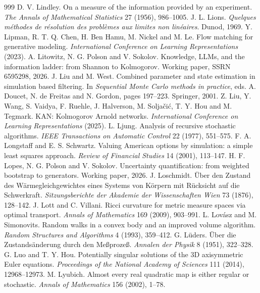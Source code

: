 \begin{thebibliography}{999}
 D. V. Lindley. On a measure of the information provided by an experiment. \emph{The Annals of Mathematical Statistics} 27 (1956), 986--1005.
 J. L. Lions. \emph{Quelques m\'ethodes de r\'esolution des probl\`emes aux limites non lin\'eaires}. Dunod, 1969.
 Y. Lipman, R. T. Q. Chen, H. Ben Hamu, M. Nickel and M. Le. Flow matching for generative modeling. \emph{International Conference on Learning Representations} (2023).
 A. Litowitz, N. G. Polson and V. Sokolov. Knowledge, LLMs, and the information ladder: from Shannon to Kolmogorov. Working paper, SSRN 6595298, 2026.
 J. Liu and M. West. Combined parameter and state estimation in simulation based filtering. In \emph{Sequential Monte Carlo methods in practice}, eds. A. Doucet, N. de Freitas and N. Gordon, pages 197--223. Springer, 2001.
 Z. Liu, Y. Wang, S. Vaidya, F. Ruehle, J. Halverson, M. Solja\v{c}i\'c, T. Y. Hou and M. Tegmark. KAN: Kolmogorov Arnold networks. \emph{International Conference on Learning Representations} (2025).
 L. Ljung. Analysis of recursive stochastic algorithms. \emph{IEEE Transactions on Automatic Control} 22 (1977), 551--575.
 F. A. Longstaff and E. S. Schwartz. Valuing American options by simulation: a simple least squares approach. \emph{Review of Financial Studies} 14 (2001), 113--147.
 H. F. Lopes, N. G. Polson and V. Sokolov. Uncertainty quantification: from weighted bootstrap to generators. Working paper, 2026.
 J. Loschmidt. \"Uber den Zustand des W\"armegleichgewichtes eines Systems von K\"orpern mit R\"ucksicht auf die Schwerkraft. \emph{Sitzungsberichte der Akademie der Wissenschaften Wien} 73 (1876), 128--142.
 J. Lott and C. Villani. Ricci curvature for metric measure spaces via optimal transport. \emph{Annals of Mathematics} 169 (2009), 903--991.
 L. Lov\'asz and M. Simonovits. Random walks in a convex body and an improved volume algorithm. \emph{Random Structures and Algorithms} 4 (1993), 359--412.
 G. L\"uders. \"Uber die Zustands\"anderung durch den Me\ss{}proze\ss. \emph{Annalen der Physik} 8 (1951), 322--328.
 G. Luo and T. Y. Hou. Potentially singular solutions of the 3D axisymmetric Euler equations. \emph{Proceedings of the National Academy of Sciences} 111 (2014), 12968--12973.
 M. Lyubich. Almost every real quadratic map is either regular or stochastic. \emph{Annals of Mathematics} 156 (2002), 1--78.

\end{thebibliography}
